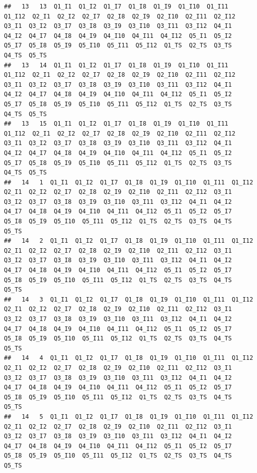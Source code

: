 \documentclass[
]{book}
\begin{document}
\begin{verbatim}
##   13   13  Q1_I1  Q1_I2  Q1_I7  Q1_I8  Q1_I9  Q1_I10  Q1_I11  Q1_I12  Q2_I1  Q2_I2  Q2_I7  Q2_I8  Q2_I9  Q2_I10  Q2_I11  Q2_I12  Q3_I1  Q3_I2  Q3_I7  Q3_I8  Q3_I9  Q3_I10  Q3_I11  Q3_I12  Q4_I1  Q4_I2  Q4_I7  Q4_I8  Q4_I9  Q4_I10  Q4_I11  Q4_I12  Q5_I1  Q5_I2  Q5_I7  Q5_I8  Q5_I9  Q5_I10  Q5_I11  Q5_I12  Q1_TS  Q2_TS  Q3_TS  Q4_TS  Q5_TS
##   13   14  Q1_I1  Q1_I2  Q1_I7  Q1_I8  Q1_I9  Q1_I10  Q1_I11  Q1_I12  Q2_I1  Q2_I2  Q2_I7  Q2_I8  Q2_I9  Q2_I10  Q2_I11  Q2_I12  Q3_I1  Q3_I2  Q3_I7  Q3_I8  Q3_I9  Q3_I10  Q3_I11  Q3_I12  Q4_I1  Q4_I2  Q4_I7  Q4_I8  Q4_I9  Q4_I10  Q4_I11  Q4_I12  Q5_I1  Q5_I2  Q5_I7  Q5_I8  Q5_I9  Q5_I10  Q5_I11  Q5_I12  Q1_TS  Q2_TS  Q3_TS  Q4_TS  Q5_TS
##   13   15  Q1_I1  Q1_I2  Q1_I7  Q1_I8  Q1_I9  Q1_I10  Q1_I11  Q1_I12  Q2_I1  Q2_I2  Q2_I7  Q2_I8  Q2_I9  Q2_I10  Q2_I11  Q2_I12  Q3_I1  Q3_I2  Q3_I7  Q3_I8  Q3_I9  Q3_I10  Q3_I11  Q3_I12  Q4_I1  Q4_I2  Q4_I7  Q4_I8  Q4_I9  Q4_I10  Q4_I11  Q4_I12  Q5_I1  Q5_I2  Q5_I7  Q5_I8  Q5_I9  Q5_I10  Q5_I11  Q5_I12  Q1_TS  Q2_TS  Q3_TS  Q4_TS  Q5_TS
##   14   1  Q1_I1  Q1_I2  Q1_I7  Q1_I8  Q1_I9  Q1_I10  Q1_I11  Q1_I12  Q2_I1  Q2_I2  Q2_I7  Q2_I8  Q2_I9  Q2_I10  Q2_I11  Q2_I12  Q3_I1  Q3_I2  Q3_I7  Q3_I8  Q3_I9  Q3_I10  Q3_I11  Q3_I12  Q4_I1  Q4_I2  Q4_I7  Q4_I8  Q4_I9  Q4_I10  Q4_I11  Q4_I12  Q5_I1  Q5_I2  Q5_I7  Q5_I8  Q5_I9  Q5_I10  Q5_I11  Q5_I12  Q1_TS  Q2_TS  Q3_TS  Q4_TS  Q5_TS
##   14   2  Q1_I1  Q1_I2  Q1_I7  Q1_I8  Q1_I9  Q1_I10  Q1_I11  Q1_I12  Q2_I1  Q2_I2  Q2_I7  Q2_I8  Q2_I9  Q2_I10  Q2_I11  Q2_I12  Q3_I1  Q3_I2  Q3_I7  Q3_I8  Q3_I9  Q3_I10  Q3_I11  Q3_I12  Q4_I1  Q4_I2  Q4_I7  Q4_I8  Q4_I9  Q4_I10  Q4_I11  Q4_I12  Q5_I1  Q5_I2  Q5_I7  Q5_I8  Q5_I9  Q5_I10  Q5_I11  Q5_I12  Q1_TS  Q2_TS  Q3_TS  Q4_TS  Q5_TS
##   14   3  Q1_I1  Q1_I2  Q1_I7  Q1_I8  Q1_I9  Q1_I10  Q1_I11  Q1_I12  Q2_I1  Q2_I2  Q2_I7  Q2_I8  Q2_I9  Q2_I10  Q2_I11  Q2_I12  Q3_I1  Q3_I2  Q3_I7  Q3_I8  Q3_I9  Q3_I10  Q3_I11  Q3_I12  Q4_I1  Q4_I2  Q4_I7  Q4_I8  Q4_I9  Q4_I10  Q4_I11  Q4_I12  Q5_I1  Q5_I2  Q5_I7  Q5_I8  Q5_I9  Q5_I10  Q5_I11  Q5_I12  Q1_TS  Q2_TS  Q3_TS  Q4_TS  Q5_TS
##   14   4  Q1_I1  Q1_I2  Q1_I7  Q1_I8  Q1_I9  Q1_I10  Q1_I11  Q1_I12  Q2_I1  Q2_I2  Q2_I7  Q2_I8  Q2_I9  Q2_I10  Q2_I11  Q2_I12  Q3_I1  Q3_I2  Q3_I7  Q3_I8  Q3_I9  Q3_I10  Q3_I11  Q3_I12  Q4_I1  Q4_I2  Q4_I7  Q4_I8  Q4_I9  Q4_I10  Q4_I11  Q4_I12  Q5_I1  Q5_I2  Q5_I7  Q5_I8  Q5_I9  Q5_I10  Q5_I11  Q5_I12  Q1_TS  Q2_TS  Q3_TS  Q4_TS  Q5_TS
##   14   5  Q1_I1  Q1_I2  Q1_I7  Q1_I8  Q1_I9  Q1_I10  Q1_I11  Q1_I12  Q2_I1  Q2_I2  Q2_I7  Q2_I8  Q2_I9  Q2_I10  Q2_I11  Q2_I12  Q3_I1  Q3_I2  Q3_I7  Q3_I8  Q3_I9  Q3_I10  Q3_I11  Q3_I12  Q4_I1  Q4_I2  Q4_I7  Q4_I8  Q4_I9  Q4_I10  Q4_I11  Q4_I12  Q5_I1  Q5_I2  Q5_I7  Q5_I8  Q5_I9  Q5_I10  Q5_I11  Q5_I12  Q1_TS  Q2_TS  Q3_TS  Q4_TS  Q5_TS

\end{verbatim}
\end{document}
